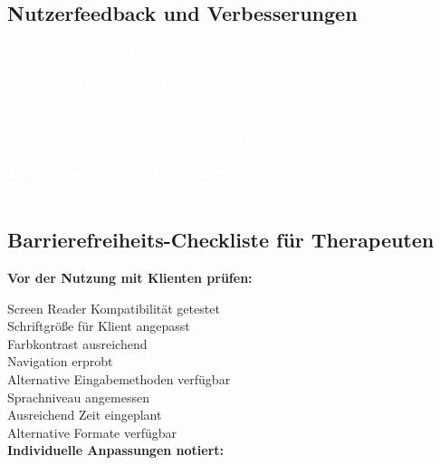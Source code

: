 \subsection{Nutzerfeedback und Verbesserungen}

\begin{ctmmRedBox}[title=\textcolor{white}{Accessibility Feedback-System}]

\textcolor{white}{\textbf{Verbesserungsvorschläge erwünscht:}}

\begin{itemize}
    \item[\textcolor{white}{•}] \textcolor{white}{Welche Barrieren sind Ihnen aufgefallen?}
    \item[\textcolor{white}{•}] \textcolor{white}{Welche assistiven Technologien nutzen Sie?}
    \item[\textcolor{white}{•}] \textcolor{white}{Welche Anpassungen wären hilfreich?}
\end{itemize}

\textcolor{white}{\textbf{Kontakt für Accessibility-Feedback:}}\\
\textcolor{white}{E-Mail: accessibility@ctmm-system.org}

\end{ctmmRedBox}

\subsection{Barrierefreiheits-Checkliste für Therapeuten}

\begin{ctmmGreenBox}[title=Implementierungs-Leitfaden]

\textbf{Vor der Nutzung mit Klienten prüfen:}

\CheckBox[name=accessibility_screen_reader,width=1em,height=1em]{} Screen Reader Kompatibilität getestet \\
\CheckBox[name=accessibility_font_size,width=1em,height=1em]{} Schriftgröße für Klient angepasst \\
\CheckBox[name=accessibility_color_contrast,width=1em,height=1em]{} Farbkontrast ausreichend \\
\CheckBox[name=accessibility_navigation,width=1em,height=1em]{} Navigation erprobt \\
\CheckBox[name=accessibility_input_methods,width=1em,height=1em]{} Alternative Eingabemethoden verfügbar \\
\CheckBox[name=accessibility_language_level,width=1em,height=1em]{} Sprachniveau angemessen \\
\CheckBox[name=accessibility_time_limits,width=1em,height=1em]{} Ausreichend Zeit eingeplant \\
\CheckBox[name=accessibility_backup_formats,width=1em,height=1em]{} Alternative Formate verfügbar \\

\textbf{Individuelle Anpassungen notiert:} \\
\TextField[name=accessibility_individual_notes,width=14cm,height=3em,multiline=true,bordercolor=ctmmGreen,backgroundcolor=ctmmGreen!5]{}

\end{ctmmGreenBox}

\newpage
